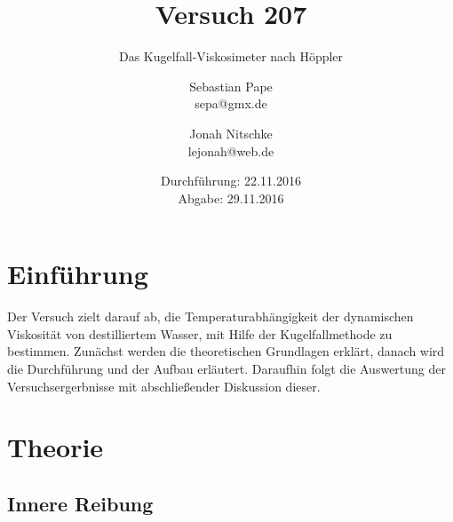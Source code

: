 

\title{Versuch 207}
\subtitle{Das Kugelfall-Viskosimeter nach Höppler}
\author{Sebastian Pape\\
        sepa@gmx.de \and
        Jonah Nitschke\\
        lejonah@web.de}
\date{Durchführung: 22.11.2016\\
      Abgabe: 29.11.2016}



\maketitle
\tableofcontents
\newpage

\section{Einführung}

Der Versuch zielt darauf ab, die Temperaturabhängigkeit der dynamischen Viskosität von destilliertem
Wasser, mit Hilfe der Kugelfallmethode zu bestimmen. Zunächst werden die theoretischen Grundlagen
erklärt, danach wird die Durchführung und der Aufbau erläutert. Daraufhin folgt die Auswertung der Versuchsergerbnisse
mit abschließender Diskussion dieser.

\section{Theorie}

\subsection{Innere Reibung}


